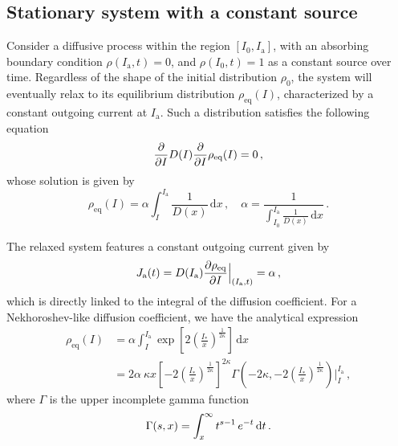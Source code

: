 
\subsection{Stationary system with a constant  source}\label{subsec:system_infinite_regime}


Consider a diffusive process within the region $[I_0, I_\mathrm{a}]$, with an absorbing boundary condition $\rho(I_\mathrm{a}, t) = 0$, and $\rho(I_0, t) = 1$ as a constant source over time. Regardless of the shape of the initial distribution $\rho_0$, the system will eventually relax to its equilibrium distribution $\rho_\text{eq}(I)$, characterized by a constant outgoing current at $I_\mathrm{a}$. Such a distribution satisfies the following equation
\begin{equation}
    \pdv{I} D(I) \pdv{I} \rho_{\text{eq}}(I) = 0 \,,
\end{equation}
whose solution is given by
\begin{equation}
    \rho_\text{eq}(I) = \alpha \int_I^{I_\mathrm{a}} \frac{1}{D(x)}\,\mathrm{d}x \,, \quad \alpha = \frac{1}{ \displaystyle{\int_{I_0}^{I_\mathrm{a}} \frac{1}{D(x)}\,\mathrm{d}x}} \, .
    \label{eq:equilibrium_stationary_distribution}
\end{equation}

The relaxed system features a constant outgoing current given by
\begin{equation}
    J_\mathrm{a}(t) = D(I_\mathrm{a})\pdv{\rho_\text{eq}}{I}\Bigr|_{(I_\mathrm{a},t)} = \alpha\,,
    \label{eq:equilibrium_stationary_current}
\end{equation} 
which is directly linked to the integral of the diffusion coefficient. For a Nekhoroshev-like diffusion coefficient, we have the analytical expression
\begin{equation}
    \begin{aligned}
        \rho_\text{eq}(I) &= \alpha \int_I^{I_\mathrm{a}} \exp\left[2\left(\frac{I_\ast}{x}\right)^{\frac{1}{2\kappa}}\right] \,\mathrm{d}x \\
        &= 2\alpha\ \kappa x \left[-2\left(\frac{I_\ast}{x}\right)^{\frac{1}{2\kappa}}\right]^{2\kappa} \Gamma\left(-2\kappa, -2\left(\frac{I_\ast}{x}\right)^{\frac{1}{2\kappa}}\right)\Bigg|_I^{I_\mathrm{a}}\,,
    \end{aligned}
\end{equation}
where $\Gamma$ is the upper incomplete gamma function
\begin{equation}
    \Gamma(s,x) = \int_x^{\infty} t^{s-1}\,e^{-t}\,{\rm d}t \,.
\end{equation}

